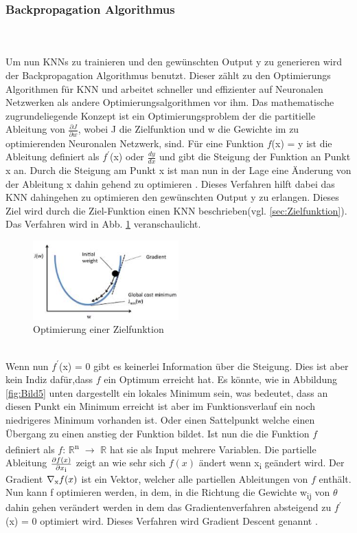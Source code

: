 \documentclass{llncs}
\begin{document}
\subsubsection{Backpropagation Algorithmus}\label{sec:test}
~\\\\
Um nun KNNs zu trainieren und den gewünschten Output y zu generieren wird der Backpropagation Algorithmus benutzt. Dieser zählt zu den Optimierungs Algorithmen für KNN und arbeitet schneller und effizienter auf Neuronalen Netzwerken als andere Optimierungsalgorithmen vor ihm. Das mathematische zugrundeliegende Konzept ist ein Optimierungsproblem der die partitielle Ableitung von  $\frac{\partial J}{\partial w}$, wobei J die Zielfunktion und w die Gewichte im zu optimierenden Neuronalen Netzwerk, sind. Für eine Funktion $f$(x) = y ist die Ableitung definiert als $f^\prime$(x) oder $\frac{dy}{dx}$ und gibt die Steigung der Funktion an Punkt x an. Durch die Steigung am Punkt x ist man nun in der Lage eine Änderung von der Ableitung x dahin gehend  zu optimieren \cite{Grundlagen}. Dieses Verfahren hilft dabei das KNN  dahingehen zu optimieren den gewünschten Output y zu erlangen. Dieses Ziel wird durch die Ziel-Funktion einen KNN beschrieben(vgl. \ref{sec:Zielfunktion}). Das Verfahren wird in Abb. \ref{fig:Bild4} veranschaulicht.   
\\
\begin{figure}[htbp] 
	\centering
	\includegraphics[width=0.5\textwidth]{gradient.png}
	\caption{Optimierung einer Zielfunktion}
	\label{fig:Bild4}
\end{figure}
\\
Wenn nun $f^\prime$(x) = 0 gibt es keinerlei Information über die Steigung. Dies ist aber kein Indiz dafür,dass $f$ ein Optimum erreicht hat. Es könnte, wie in Abbildung \ref{fig:Bild5} unten dargestellt ein lokales Minimum sein, was bedeutet, dass an diesen Punkt ein Minimum erreicht ist aber im Funktionsverlauf ein noch niedrigeres Minimum vorhanden ist. Oder einen Sattelpunkt welche einen Übergang zu einen anstieg der Funktion bildet.
Ist nun die die Funktion $f$ definiert als $f$: $\mathbb{R}$\textsuperscript{n} $\rightarrow$  $\mathbb{R}$ hat sie als Input mehrere Variablen. Die partielle Ableitung $\frac{\partial f(x)}{\partial x\textsubscript{i}}$ zeigt an wie sehr sich $f(x)$ ändert wenn x\textsubscript{i} geändert wird. Der Gradient $\nabla\textsubscript{x}f(x)$ ist ein Vektor, welcher alle partiellen Ableitungen von $f$ enthält. Nun kann f optimieren  werden, in dem, in die Richtung die Gewichte w\textsubscript{ij} von $\theta$ dahin gehen verändert werden in dem das Gradientenverfahren absteigend zu $f^\prime$(x) = 0 optimiert wird. Dieses Verfahren wird Gradient Descent genannt \cite{Grundlagen}.
\end{document}
